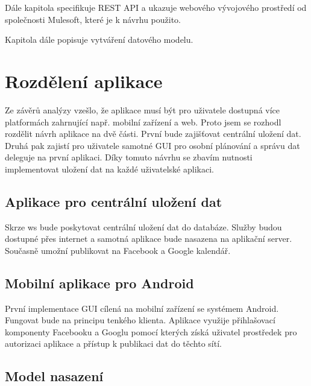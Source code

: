 \documentclass[thesis=B,czech]{FITthesis}[2012/06/26]
\begin{document}
Dále kapitola specifikuje REST API a ukazuje webového vývojového prostředí od společnosti Mulesoft, které je k návrhu použito. 

Kapitola dále popisuje vytváření datového modelu.

\section{Rozdělení aplikace}

Ze závěrů analýzy vzešlo, že aplikace musí být pro uživatele dostupná více platformách zahrnující např. mobilní zařízení a web. Proto jsem se rozhodl rozdělit návrh aplikace na dvě části. První bude zajišťovat centrální uložení dat. Druhá pak zajistí pro uživatele samotné GUI pro osobní plánování a správu dat deleguje na první aplikaci. Díky tomuto návrhu se zbavím nutnosti implementovat uložení dat na každé uživatelské aplikaci.

\subsection{Aplikace pro centrální uložení dat}

Skrze \acrshort{ws} bude poskytovat centrální uložení dat do databáze. Služby budou dostupné přes internet a samotná aplikace bude nasazena na aplikační server. Současně umožní publikovat na Facebook a Google kalendář. 

\subsection{Mobilní aplikace pro Android}

První implementace GUI cílená na mobilní zařízení se systémem Android. Fungovat bude na  principu tenkého klienta\cite{gtd_thin_client}. Aplikace využije přihlašovací komponenty Facebooku a Googlu pomocí kterých získá uživatel prostředek pro autorizaci aplikace a přístup k publikaci dat do těchto sítí.

\subsection{Model nasazení}
\end{document}
